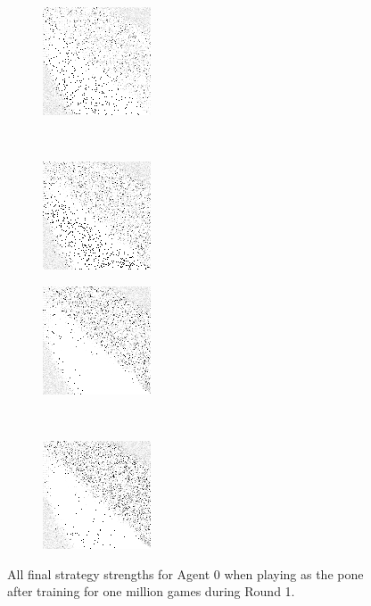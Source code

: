 \begin{figure}
	\begin{subfigure}[b]{0.4\textwidth}
		\includegraphics[height=0.23\textheight]{images/findings/round1/strategies_cribminavg_pone.png}
		\caption{\cribminavg}
	\end{subfigure}
	~
	\begin{subfigure}[b]{0.4\textwidth}
		\includegraphics[height=0.23\textheight]{images/findings/round1/strategies_peggingmaxavggained_pone.png}
		\caption{\peggingmaxavggained}
	\end{subfigure}

	\begin{subfigure}[b]{0.4\textwidth}
		\includegraphics[height=0.23\textheight]{images/findings/round1/strategies_peggingmaxmedgained_pone.png}
		\caption{\peggingmaxmedgained}
	\end{subfigure}
	~
	\begin{subfigure}[b]{0.4\textwidth}
		\includegraphics[height=0.23\textheight]{images/findings/round1/strategies_peggingminavggiven_pone.png}
		\caption{\peggingminavggiven}
	\end{subfigure}

\caption{
	All final strategy strengths for Agent 0
	when playing as the pone
	after training for one million games during Round 1.
}
\label{fig_r1-strats}
\end{figure}

